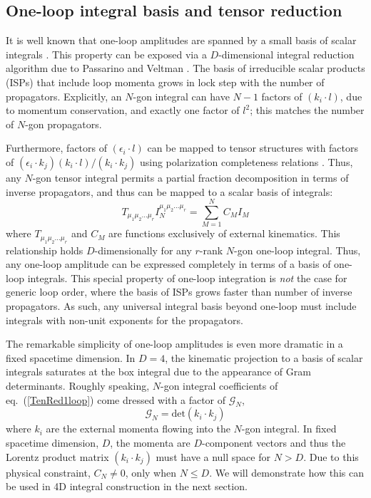\documentclass[12pt,letter]{article}
\def\eqn#1{eq.~(\ref{#1})}
\def\be{\begin{equation}}
\def\ee{\end{equation}}
\begin{document}
\subsection{One-loop integral basis and tensor reduction}
\label{sec:1loopMethods}


It is well known that one-loop amplitudes are spanned by a small basis of scalar integrals \cite{Forde:2007mi,Badger:2008cm,ElvangHuangReview}. This property can be exposed via a $D$-dimensional integral reduction algorithm due to Passarino and Veltman \cite{Passarino:1978jh}. The basis of irreducible scalar products (ISPs) that include loop momenta grows in lock step with the number of propagators. Explicitly, an $N$-gon integral can have $N-1$ factors of $(k_i\cdot l)$, due to momentum conservation, and exactly one factor of $l^2$; this matches the number of $N$-gon propagators. 

Furthermore, factors of $(\epsilon_i\cdot l)$ can be mapped to tensor structures with factors of $(\epsilon_i \cdot k_j)(k_i  \cdot l)/(k_i \cdot k_j)$ using polarization completeness relations \cite{}. Thus, any $N$-gon tensor integral permits a partial fraction decomposition in terms of inverse propagators, and thus can be mapped to a scalar basis of integrals:
\be\label{TenRed1loop}
T_{\mu_1\mu_2...\mu_r} I_N^{\mu_1\mu_2...\mu_r} = \sum_{M=1}^N C_M I_M
\ee
where $T_{\mu_1\mu_2...\mu_r}$ and $C_M$ are functions exclusively of external kinematics. This relationship holds $D$-dimensionally for any $r$-rank $N$-gon one-loop integral. Thus, any one-loop amplitude can be expressed completely in terms of a basis of one-loop integrals. This special property of one-loop integration is \textit{not} the case for generic loop order, where the basis of ISPs grows faster than number of inverse propagators. As such, any universal integral basis beyond one-loop must include integrals with non-unit exponents for the propagators.  

The remarkable simplicity of one-loop amplitudes is even more dramatic in a fixed spacetime dimension. In $D=4$, the kinematic projection to a basis of scalar integrals saturates at the box integral due to the appearance of Gram determinants. Roughly speaking, $N$-gon integral coefficients of \eqn{TenRed1loop} come dressed with a factor of $\mathcal{G}_N$,
\be
\mathcal{G}_N = \text{det} (k_i \cdot k_j)
\ee
where $k_i$ are the external momenta flowing into the $N$-gon integral. In fixed spacetime dimension, $D$, the momenta are $D$-component vectors and thus the Lorentz product matrix $(k_i \cdot k_j)$ must have a null space for $N>D$. Due to this physical constraint, $C_N \neq 0$, only when $N\leq D$. We will demonstrate how this can be used in 4D integral construction in the next section. 
\end{document}

